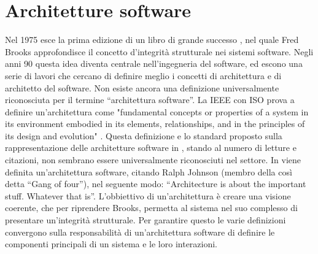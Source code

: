\documentclass[a4paper,12pt]{report}
\begin{document}
\section{Architetture software}
Nel 1975 esce la prima edizione di un libro di grande successo \cite{brooks_jr_mythical_1974}, nel quale Fred Brooks approfondisce il concetto d'integrità strutturale nei sistemi software.
Negli anni 90 questa idea diventa centrale nell'ingegneria del software, ed escono una serie di lavori che  cercano di definire meglio i concetti di architettura e di architetto del software. 
Non esiste ancora una definizione universalmente riconosciuta per il termine ``architettura software''.
La IEEE con ISO prova a definire un'architettura come "fundamental concepts or properties of a system in its environment embodied in its elements, relationships, and in the principles of its design and evolution" \cite{isoiecieee_2011}.
Questa definizione e lo standard proposto sulla rappresentazione delle architetture software in \cite{isoiecieee_2011}, stando al numero di letture e citazioni, non sembrano essere universalmente riconosciuti nel settore.
In \cite{whoneedsanArchitect} viene definita un'architettura software, citando Ralph Johnson (membro della così detta ``Gang of four''), nel seguente modo: ``Architecture is about the important stuff. Whatever that is''. 
L'obbiettivo di un'architettura è creare una visione coerente, che per riprendere Brooks, permetta al sistema nel suo complesso di presentare un'integrità strutturale. 
Per garantire questo le varie definizioni convergono sulla responsabilità di un'architettura software di definire le componenti principali di un sistema e le loro interazioni.
\end{document}
